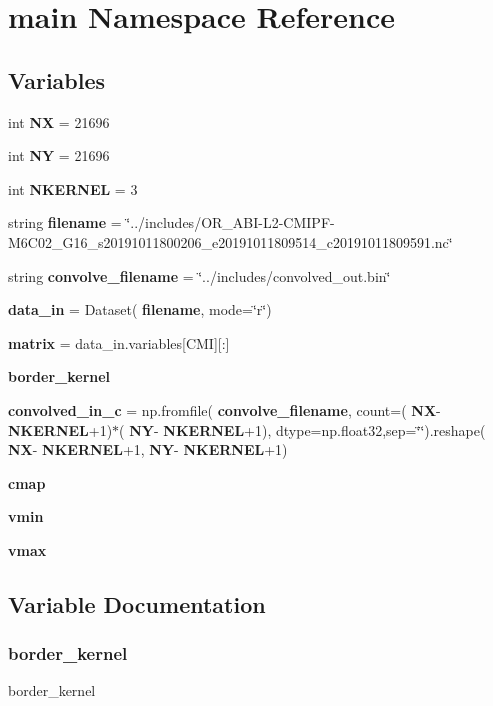 \section{main Namespace Reference}
\label{namespacemain}
\subsection*{Variables}
\begin{DoxyCompactItemize}
\item 
int \textbf{ NX} = 21696
\item 
int \textbf{ NY} = 21696
\item 
int \textbf{ N\+K\+E\+R\+N\+EL} = 3
\item 
string \textbf{ filename} = \char`\"{}../includes/O\+R\+\_\+\+A\+BI-\/L2-\/C\+M\+I\+PF-\/M6\+C02\+\_\+\+G16\+\_\+s20191011800206\+\_\+e20191011809514\+\_\+c20191011809591.\+nc\char`\"{}
\item 
string \textbf{ convolve\+\_\+filename} = \char`\"{}../includes/convolved\+\_\+out.\+bin\char`\"{}
\item 
\textbf{ data\+\_\+in} = Dataset(\textbf{ filename}, mode=\char`\"{}r\char`\"{})
\item 
\textbf{ matrix} = data\+\_\+in.\+variables[\textquotesingle{}C\+MI\textquotesingle{}][\+:]
\item 
\textbf{ border\+\_\+kernel}
\item 
\textbf{ convolved\+\_\+in\+\_\+c} = np.\+fromfile(\textbf{ convolve\+\_\+filename}, count=(\textbf{ NX}-\/\textbf{ N\+K\+E\+R\+N\+EL}+1)$\ast$(\textbf{ NY}-\/\textbf{ N\+K\+E\+R\+N\+EL}+1), dtype=np.\+float32,sep=\char`\"{}\char`\"{}).reshape(\textbf{ NX}-\/\textbf{ N\+K\+E\+R\+N\+EL}+1,\textbf{ NY}-\/\textbf{ N\+K\+E\+R\+N\+EL}+1)
\item 
\textbf{ cmap}
\item 
\textbf{ vmin}
\item 
\textbf{ vmax}
\end{DoxyCompactItemize}


\subsection{Variable Documentation}
\mbox{\label{namespacemain_a896fa6862969b2496d05a321409f012b}} 
\subsubsection{border\_kernel}
{\footnotesize\ttfamily border\+\_\+kernel}

